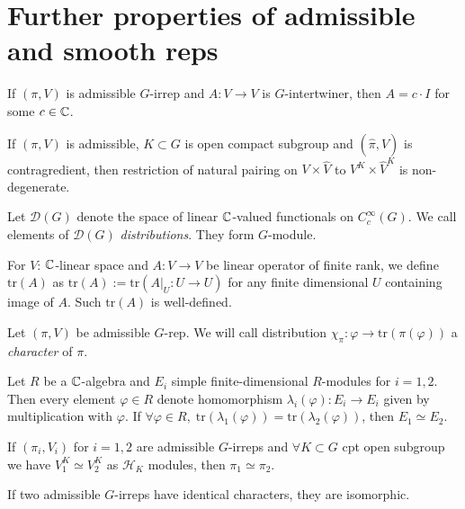 \documentclass[pdf,notes]{beamer}
\newcommand{\tr}{\mbox{tr}}
\theoremstyle{mystyle}
\begin{document}
\section{Further properties of admissible and smooth reps}
\begin{frame}
	\begin{theorem}
		If $(\pi,V)$ is admissible $G$-irrep and $A:V\to V$ is $G$-intertwiner, then $A=c\cdot I$ for some $c\in\mathbb{C}$.
		\label{}
	\end{theorem}
	\begin{theorem}
		If $(\pi,V)$ is admissible, $K\subset G$ is open compact subgroup
		and $(\hat{\pi},\hat{V})$ is contragredient, then restriction of natural pairing
		on $V\times\hat{V}$ to $V^K\times\hat{V}^{K}$ is non-degenerate.
		\label{}
	\end{theorem}
\end{frame}
\begin{frame}
	\begin{definition}
		Let $\mathcal{D}(G)$ denote the space of linear $\mathbb{C}$-valued functionals on $C^\infty_c(G)$. We call elements
		of $\mathcal{D}(G)$ {\it distributions}. They form $G$-module.
	\end{definition}
	\begin{definition}
		For $V$: $\mathbb{C}$-linear space and $A:V\to V$ be linear operator of finite rank, we define $\tr(A)$ as $\tr(A):=\tr(A
		\bigg|_U:U\to U)$ for any finite dimensional $U$ containing image of $A$. Such $\tr(A)$ is well-defined.
	\end{definition}
	\begin{definition}
		Let $(\pi,V)$ be admissible $G$-rep. We will call distribution $\chi_\pi:\varphi\to
		\tr(\pi(\varphi))$ a {\it character} of $\pi$.
	\end{definition}
\end{frame}
\begin{frame}
	\begin{theorem}
		Let $R$ be a $\mathbb{C}$-algebra and $E_i$ simple finite-dimensional $R$-modules for $i=1,2$. Then every element
		$\varphi\in R$ denote homomorphism $\lambda_i(\varphi):E_i\to E_i$ given by multiplication with $\varphi$. If
		$\forall\varphi\in R,\;\tr(\lambda_1(\varphi))=\tr(\lambda_2(\varphi))$, then $E_1\simeq E_2$.
		\label{<++>}
	\end{theorem}
	\begin{theorem}
		If $(\pi_i,V_i)$ for $i=1,2$ are admissible $G$-irreps and $\forall K\subset G$ cpt open subgroup we have
		$V_1^K\simeq V_2^K$ as $\mathcal{H}_K$ modules, then $\pi_1\simeq\pi_2$.
		\label{}
	\end{theorem}
	\begin{theorem}
		If two admissible $G$-irreps have identical characters, they are isomorphic.
		\label{}
	\end{theorem}
\end{frame}
\end{document}
